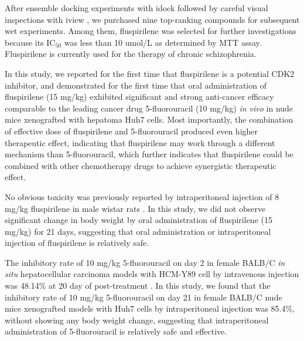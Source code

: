 \documentclass[10pt]{article}
\begin{document}
After ensemble docking experiments with idock \cite{1153,1362} followed by careful visual inspections with iview \cite{1366}, we purchased nine top-ranking compounds for subsequent wet experiments. Among them, fluspirilene was selected for further investigations because its IC$_{50}$ was less than 10 umol/L as determined by MTT assay. Fluspirilene is currently used for the therapy of chronic schizophrenia.%

In this study, we reported for the first time that fluspirilene is a potential CDK2 inhibitor, and demonstrated for the first time that oral administration of fluspirilene (15 mg/kg) exhibited significant and strong anti-cancer efficacy comparable to the leading cancer drug 5-fluorouracil (10 mg/kg) \textit{in vivo} in nude mice xenografted with hepatoma Huh7 cells. Most importantly, the combination of effective dose of fluspirilene and 5-fluorouracil produced even higher therapeutic effect, indicating that fluspirilene may work through a different mechanism than 5-fluorouracil, which further indicates that fluspirilene could be combined with other chemotherapy drugs to achieve synergistic therapeutic effect.

No obvious toxicity was previously reported by intraperitoneal injection of 8 mg/kg fluspirilene in male wistar rats \cite{1610}. In this study, we did not observe significant change in body weight by oral administration of fluspirilene (15 mg/kg) for 21 days, suggesting that oral administration or intraperitoneal injection of fluspirilene is relatively safe.

The inhibitory rate of 10 mg/kg 5-fluorouracil on day 2 in female BALB/C \textit{in situ} hepatocellular carcinoma models with HCM-Y89 cell by intravenous injection was 48.14\% at 20 day of post-treatment \cite{1609}. In this study, we found that the inhibitory rate of 10 mg/kg 5-fluorouracil on day 21 in female BALB/C nude mice xenografted models with Huh7 cells by intraperitoneal injection was 85.4\%, without showing any body weight change, suggesting that intraperitoneal administration of 5-fluorouracil is relatively safe and effective.

\end{document}
